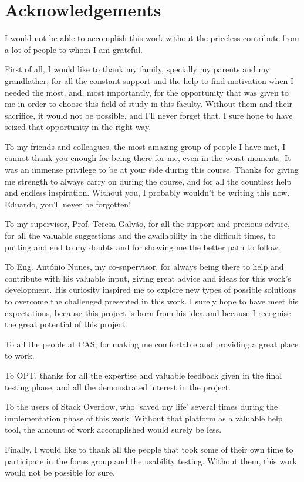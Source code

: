\chapter*{Acknowledgements}

I would not be able to accomplish this work without the priceless contribute from a lot of people to whom I am grateful.

First of all, I would like to thank my family, specially my parents and my grandfather, for all the constant support and the help to find motivation when I needed the most, and, most importantly, for the opportunity that was given to me in order to choose this field of study in this faculty. Without them and their sacrifice, it would not be possible, and I'll never forget that. I sure hope to have seized that opportunity in the right way.

To my friends and colleagues, the most amazing group of people I have met, I cannot thank you enough for being there for me, even in the worst moments. It was an immense privilege to be at your side during this course. Thanks for giving me strength to always carry on during the course, and for all the countless help and endless inspiration. Without you, I probably wouldn't be writing this now. Eduardo, you'll never be forgotten!

To my supervisor, Prof. Teresa Galvão, for all the support and precious advice, for all the valuable suggestions and the availability in the difficult times, to putting and end to my doubts and for showing me the better path to follow.

To Eng. António Nunes, my co-supervisor, for always being there to help and contribute with his valuable input, giving great advice and ideas for this work's development. His curiosity inspired me to explore new types of possible solutions to overcome the challenged presented in this work. I surely hope to have meet his expectations, because this project is born from his idea and because I recognise the great potential of this project.

To all the people at CAS, for making me comfortable and providing a great place to work.

To OPT, thanks for all the expertise and valuable feedback given in the final testing phase, and all the demonstrated interest in the project.

To the users of Stack Overflow, who 'saved my life' several times during the implementation phase of this work. Without that platform as a valuable help tool, the amount of work accomplished would surely be less.

Finally, I would like to thank all the people that took some of their own time to participate in the focus group and the usability testing. Without them, this work would not be possible for sure.



\vspace{10mm}
